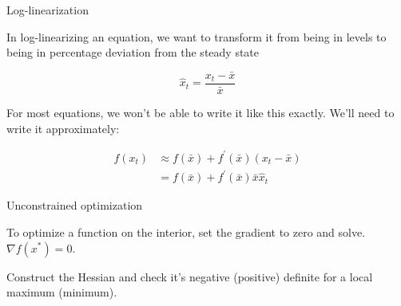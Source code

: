 \documentclass[11pt, xcolor={dvipsnames}, hyperref={colorlinks, allcolors=Blue}]{beamer}
\begin{document}
\begin{frame}{Log-linearization}

In log-linearizing an equation, we want to transform it from being in levels to being in percentage deviation from the steady state

\[\hat{x}_{t} = \frac{x_{t} - \bar{x}}{\bar{x}}\]
\bigskip

For most equations, we won't be able to write it like this exactly. We'll need to write it approximately:

\begin{align*}
f(x_{t}) &\approx f(\bar{x}) + f^{\prime}(\bar{x}) (x_{t} - \bar{x})\\
&= f(\bar{x}) + f^{\prime}(\bar{x})\bar{x} \hat{x}_{t}
\end{align*}
\end{frame}

\begin{frame}{Unconstrained optimization}

To optimize a function on the interior, set the gradient to zero and solve. $\nabla f(x^{*}) = 0$.\bigskip
\bigskip

Construct the Hessian and check it's negative (positive) definite for a local maximum (minimum).

\end{frame}
\end{document}
